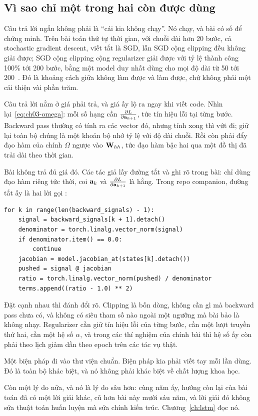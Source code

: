 \subsection*{Vì sao chỉ một trong hai còn được dùng}

%
Câu trả lời ngắn không phải là \enquote{cái kia không chạy}. Nó chạy, và bài có
số để chứng minh. Trên bài toán thứ tự thời gian, với chuỗi dài hơn 20 bước, cả
stochastic gradient descent, viết tắt là SGD, lẫn SGD cộng clipping đều không
giải được; SGD cộng clipping cộng
regularizer giải được với tỷ lệ thành công 100\% tới 200 bước, bằng một model
duy nhất dùng cho mọi độ dài từ 50 tới 200~\autocite{pascanu2013difficulty}. Đó là khoảng cách giữa không làm
được và làm được, chứ không phải một cải thiện vài phần trăm.

Câu trả lời nằm ở giá phải trả, và giá ấy lộ ra ngay khi viết code. Nhìn
lại~\eqref{eq:ch03-omega}: mỗi số hạng cần \(\frac{\partial L}{\partial \mathbf{a}_{k+1}}\),
tức tín hiệu lỗi tại từng bước. Backward pass thường có tính ra các vector đó,
nhưng tính xong thì vứt đi; giữ lại toàn bộ chúng là một khoản bộ nhớ tỷ lệ với
độ dài chuỗi. Rồi còn phải đẩy đạo hàm của chính \(\Omega\) ngược vào
\(\mathbf{W}_{hh}\), tức đạo hàm bậc hai qua một đồ thị đã trải dài theo thời gian.

Bài không trả đủ giá đó. Các tác giả lấy đường tắt và ghi rõ trong bài: chỉ dùng
đạo hàm riêng tức thời, coi \(\mathbf{a}_k\) và \(\frac{\partial L}{\partial \mathbf{a}_{k+1}}\)
là hằng. Trong repo companion, đường tắt ấy là hai lời gọi :

\begin{verbatim}
for k in range(len(backward_signals) - 1):
    signal = backward_signals[k + 1].detach()
    denominator = torch.linalg.vector_norm(signal)
    if denominator.item() == 0.0:
        continue
    jacobian = model.jacobian_at(states[k].detach())
    pushed = signal @ jacobian
    ratio = torch.linalg.vector_norm(pushed) / denominator
    terms.append((ratio - 1.0) ** 2)
\end{verbatim}

Đặt cạnh nhau thì đánh đổi rõ. Clipping là bốn dòng, không cần gì mà backward
pass chưa có, và không có siêu tham số nào ngoài một ngưỡng mà bài bảo là không
nhạy. Regularizer cần giữ tín hiệu lỗi của từng bước, cần một lượt truyền thứ
hai, cần một hệ số \(\alpha\), và trong các thí nghiệm của chính bài thì hệ số
ấy còn phải theo lịch giảm dần theo epoch trên các tác vụ thật.

Một biện pháp đi vào thư viện chuẩn. Biện pháp kia phải viết tay mỗi lần dùng.
Đó là toàn bộ khác biệt, và nó không phải khác biệt về chất lượng khoa học.

Còn một lý do nữa, và nó là lý do sâu hơn: cùng năm ấy, hướng còn lại của bài
toán đã có một lời giải khác, cũ hơn bài này mười sáu năm, và lời giải đó không
sửa thuật toán huấn luyện mà sửa chính kiến trúc. Chương~\ref{ch:lstm} đọc nó.
